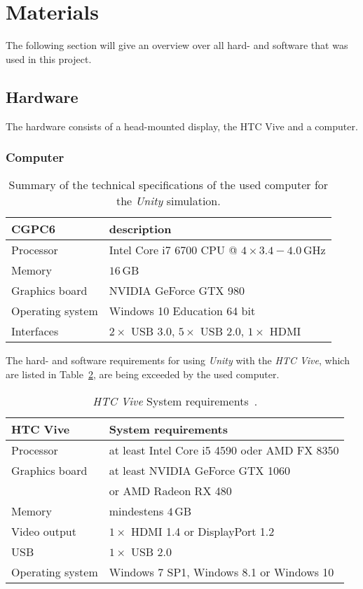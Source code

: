 \section{Materials}\label{sec:Materials}
The following section will give an overview over all hard- and software that was used in this project. 

\subsection{Hardware}\label{sec:Hardware}
The hardware consists of a head-mounted display, the HTC Vive and a computer. 

\subsubsection{Computer}\label{sec:Computer}

\begin{table}[H]
	\centering
	\begin{tabular}{|l|l|}
		\hline
		\Absatzbox{}
		\textbf{CGPC6}& \textbf{description} \\
		\hline
		Processor & Intel Core i7 6700 CPU @ $4\times3.4-4.0\,$GHz \\
		\hline
		Memory & $16\,$GB \\
		\hline 
		Graphics board & NVIDIA GeForce GTX 980\\
		\hline
		Operating system & Windows 10 Education 64 bit \\
		\hline
		Interfaces & $2\times$ USB 3.0, $5\times$ USB 2.0, $1\times $ HDMI\\
		\hline
	\end{tabular}
	\caption{Summary of the technical specifications of the used computer for the \textit{Unity} simulation.}
	\label{tab:Computer}
\end{table}

The hard- and software requirements for using \textit{Unity} with the \textit{HTC Vive}, which are listed in Table~\ref{tab:viveReq}, are being exceeded by the used computer.   

\begin{table}[H]
	\centering
	\begin{tabular}{|l|l|}
		\hline
		\Absatzbox{}
		\textbf{HTC Vive}& \textbf{System requirements} \\
		\hline
		Processor & at least Intel Core i5 4590 oder AMD FX 8350\\
		\hline
		Graphics board & at least NVIDIA GeForce GTX 1060\\
		&or AMD Radeon RX 480\\
		\hline
		Memory & mindestens $4\,$GB\\		
		\hline
		Video output & $1\times$ HDMI 1.4 or DisplayPort 1.2\\
		\hline
		USB & $1\times$ USB 2.0\\
		\hline
		Operating system & Windows 7 SP1, Windows 8.1 or Windows 10\\
		\hline
	\end{tabular}
	\caption{\textit{HTC Vive} System requirements~\cite{website:HTC_Vive_Ready}.}
	\label{tab:viveReq}
\end{table}

